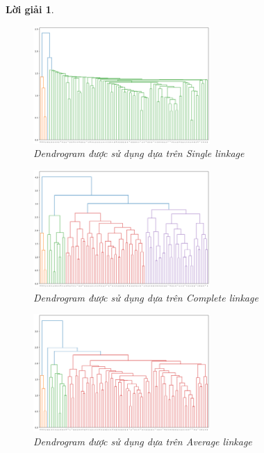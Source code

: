 \documentclass[14pt, a4paper]{article}
\theoremstyle{sltheorem}
\theoremstyle{soltheorem}
\newtheorem*{loigiai}{Lời giải}
\begin{document}
\begin{loigiai}
    \begin{figure}[h!]
        \centering
        \includegraphics[width=0.6\textwidth]{figures/dendro_single.png}
        \caption{Dendrogram được sử dụng dựa trên Single linkage}
        \label{fig:dendro-single}
    \end{figure}

    \begin{figure}[h!]
        \centering
        \includegraphics[width=0.6\textwidth]{figures/dendro_complete.png}
        \caption{Dendrogram được sử dụng dựa trên Complete linkage}
        \label{fig:dendro-complete}
    \end{figure}

    \begin{figure}[h!]
        \centering
        \includegraphics[width=0.6\textwidth]{figures/dendro_average.png}
        \caption{Dendrogram được sử dụng dựa trên Average linkage}
        \label{fig:dendro-average}
    \end{figure}


\end{loigiai}
\end{document}
